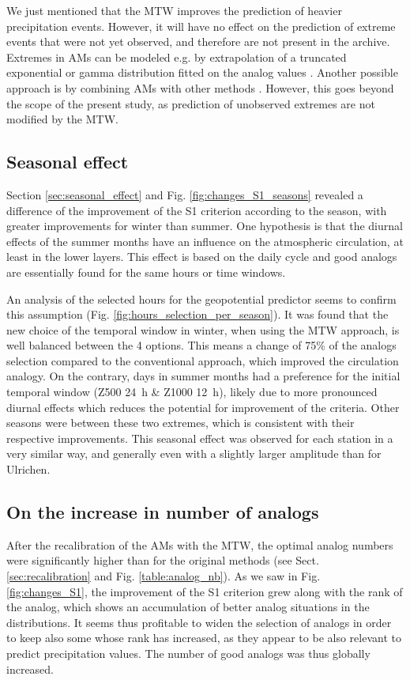 \documentclass[hess, manuscript]{copernicus}
\begin{document}
We just mentioned that the MTW improves the prediction of heavier precipitation events. However, it will have no effect on the prediction of extreme events that were not yet observed, and therefore are not present in the archive. Extremes in AMs can be modeled e.g. by extrapolation of a truncated exponential or gamma distribution fitted on the analog values \citep{Obled2002}. Another possible approach is by combining AMs with other methods \citep[e.g.][]{Chardon2014}. However, this goes beyond the scope of the present study, as prediction of unobserved extremes are not modified by the MTW.


\subsection{Seasonal effect}

Section \ref{sec:seasonal_effect} and Fig. \ref{fig:changes_S1_seasons} revealed a difference of the improvement of the S1 criterion according to the season, with greater improvements for winter than summer. One hypothesis is that the diurnal effects of the summer months have an influence on the atmospheric circulation, at least in the lower layers. This effect is based on the daily cycle and good analogs are essentially found for the same hours or time windows.

An analysis of the selected hours for the geopotential predictor seems to confirm this assumption (Fig. \ref{fig:hours_selection_per_season}). It was found that the new choice of the temporal window in winter, when using the MTW approach, is well balanced between the 4 options. This means a change of 75\% of the analogs selection compared to the conventional approach, which improved the circulation analogy. On the contrary, days in summer months had a preference for the initial temporal window (Z500 24~h \& Z1000 12~h), likely due to more pronounced diurnal effects which reduces the potential for improvement of the criteria. Other seasons were between these two extremes, which is consistent with their respective improvements. This seasonal effect was observed for each station in a very similar way, and generally even with a slightly larger amplitude than for Ulrichen.


\subsection{On the increase in number of analogs}

After the recalibration of the AMs with the MTW, the optimal analog numbers were significantly higher than for the original methods (see Sect. \ref{sec:recalibration} and Fig. \ref{table:analog_nb}). As we saw in Fig. \ref{fig:changes_S1}, the improvement of the S1 criterion grew along with the rank of the analog, which shows an accumulation of better analog situations in the distributions. It seems thus profitable to widen the selection of analogs in order to keep also some whose rank has increased, as they appear to be also relevant to predict precipitation values. The number of good analogs was thus globally increased.
\end{document}

